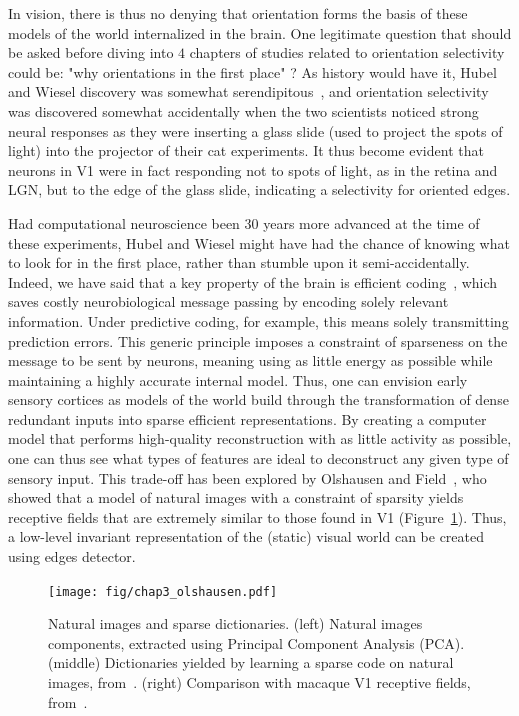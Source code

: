 In vision, there is thus no denying that orientation forms the basis of these models of the world internalized in the brain. One legitimate question that should be asked before diving into $4$ chapters of studies related to orientation selectivity could be: "why orientations in the first place" ? As history would have it, Hubel and Wiesel discovery was somewhat serendipitous~\cite{martin1994brief}, and orientation selectivity was discovered somewhat accidentally when the two scientists noticed strong neural responses as they were inserting a glass slide (used to project the spots of light) into the projector of their cat experiments. It thus become evident that neurons in \gls{V1} were in fact responding not to spots of light, as in the retina and \gls{LGN}, but to the edge of the glass slide, indicating a selectivity for oriented edges. 

Had computational neuroscience been $30$ years more advanced at the time of these experiments, Hubel and Wiesel might have had the chance of knowing what to look for in the first place, rather than stumble upon it semi-accidentally. Indeed, we have said that a key property of the brain is efficient coding~\cite{barlow1961possible}, which saves costly neurobiological message passing by encoding solely relevant information. Under predictive coding, for example, this means solely transmitting prediction errors. This generic principle imposes a constraint of sparseness on the message to be sent by neurons, meaning using as little energy as possible while maintaining a highly accurate internal model. Thus, one can envision early sensory cortices as models of the world build through the transformation of dense redundant inputs into sparse efficient representations. By creating a computer model that performs high-quality reconstruction with as little activity as possible, one can thus see what types of features are ideal to deconstruct any given type of sensory input. This trade-off has been explored by Olshausen and Field~\cite{olshausen1996emergence}, who showed that a model of natural images with a constraint of sparsity yields receptive fields that are extremely similar to those found in \gls{V1} (Figure~\ref{fig_chap3_olshausen}). Thus, a low-level invariant representation of the (static) visual world can be created using edges detector.

\begin{figure}[h!tbp]
\vspace{0.1cm}
\centering
\texttt{[image: fig/chap3\_olshausen.pdf]}
\caption[Natural images and sparse dictionaries.]{Natural images and sparse dictionaries. 
(left) Natural images components, extracted using Principal Component Analysis (PCA). 
(middle) Dictionaries yielded by learning a sparse code on natural images, from~\cite{olshausen1996emergence}. 
(right) Comparison with macaque \gls{V1} receptive fields, from~\cite{ringach2002orientation}.}
\label{fig_chap3_olshausen}
\end{figure}


